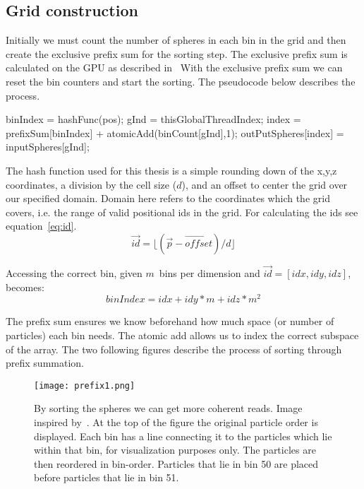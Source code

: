 \subsection{Grid construction}
Initially we must count
the number of spheres in each bin in the grid and then create the exclusive prefix sum for the sorting
step. The exclusive prefix sum is calculated on the GPU as described in~\cite{gpugems}
With the exclusive prefix sum we can reset the bin counters and start the sorting.
The pseudocode below describes
the process.

\begin{algorithm}[H]
  \begin{algorithmic}[1]
  \State binIndex = hashFunc(pos);
  \State gInd = thisGlobalThreadIndex;
  \State index = prefixSum[binIndex] + atomicAdd(binCount[gInd],1);
  \State outPutSpheres[index] = inputSpheres[gInd];
\end{algorithmic}
\end{algorithm}

The hash function used for this thesis is a simple rounding down of the x,y,z coordinates, a
division by the cell size ($d$), and an offset to center the grid over our specified domain.
Domain here refers to the coordinates which the grid covers, i.e. the range of valid positional ids
in the grid. For calculating the ids see equation~\ref{eq:id}.
\begin{equation}\label{eq:id}
  \vec{id} = \lfloor(\vec{p}-\vec{offset})/d\rfloor
\end{equation}

Accessing the correct bin, given $m$ bins per dimension and $\vec{id} = [idx,idy,idz]$, becomes:
\begin{equation}
  binIndex = idx + idy*m + idz*m^2
\end{equation}

The prefix sum ensures we know beforehand how much space (or number of particles)
each bin needs. The atomic add allows us to index the correct subspace of the
array. The two following figures describe the process of sorting through prefix summation.

\begin{figure}[H]
  \centering
  \texttt{[image: prefix1.png]}
  \caption{By sorting the spheres we can get more coherent reads. Image inspired by~\cite{fastnearest}.
  At the top of the figure the original particle order is displayed. Each bin has a line connecting it to the particles which lie within that bin, for visualization purposes only.
  The particles are then reordered in bin-order. Particles that lie in bin 50 are placed before particles that lie in bin 51.}
\end{figure}

